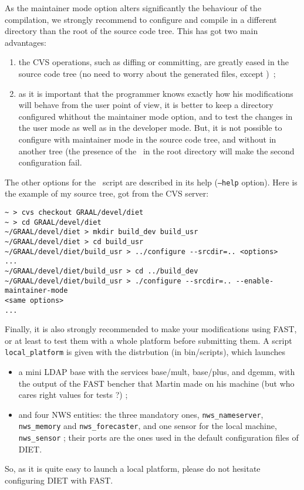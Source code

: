 As the maintainer mode option alters significantly the behaviour of the
compilation, we strongly recommend to configure and compile in a
different directory than the root of the source code tree. This has got two main
advantages:
\begin{enumerate}
\item{the CVS operations, such as diffing or committing, are greatly eased in
    the source code tree (no need to worry about the generated files, except
    \makein)~;}
\item{as it is important that the programmer knows exactly how his modifications
  will behave from the user point of view, it is better to keep a directory
  configured whithout the maintainer mode option, and to test the changes in the
  user mode as well as in the developer mode. But, it is not possible to
  configure with maintainer mode in the source code tree, and without in another
  tree (the presence of the \make\ in the root directory will make the second
  configuration fail.}
\end{enumerate}
The other options for the \configure\ script are described in its help
(\texttt{--help} option). Here is the example of my source tree, got from the
CVS server:
\begin{verbatim}
~ > cvs checkout GRAAL/devel/diet
~ > cd GRAAL/devel/diet
~/GRAAL/devel/diet > mkdir build_dev build_usr
~/GRAAL/devel/diet > cd build_usr
~/GRAAL/devel/diet/build_usr > ../configure --srcdir=.. <options>
...
~/GRAAL/devel/diet/build_usr > cd ../build_dev
~/GRAAL/devel/diet/build_usr > ./configure --srcdir=.. --enable-maintainer-mode
<same options>
...
\end{verbatim}

Finally, it is also strongly recommended to make your modifications using FAST,
or at least to test them with a whole platform before submitting them. A script
\texttt{local\_platform} is given with the distrbution (in
\textsf{bin/scripts}), which launches
\begin{itemize}
\item a mini LDAP base with the services \textsf{base/mult},
  \textsf{base/plus}, and \textsf{dgemm}, with the output of the FAST bencher
  that Martin made on his machine (but who cares right values for tests ?) ;
\item and four NWS entities: the three mandatory ones, \texttt{nws\_nameserver},
  \texttt{nws\_memory} and \texttt{nws\_forecaster}, and one sensor for the
  local machine, \texttt{nws\_sensor} ; their ports are the ones used in the
  default configuration files of DIET.
\end{itemize}
So, as it is quite easy to launch a local platform, please do not hesitate
configuring DIET with FAST.


